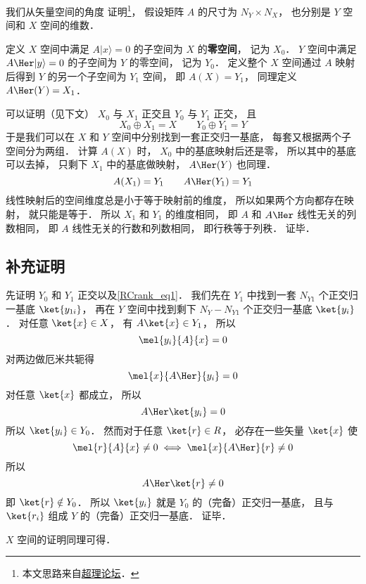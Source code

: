

我们从矢量空间的角度 证明\footnote{本文思路来自\href{https://chaoli.club/index.php/4821}{超理论坛}．}， 假设矩阵 $A$ 的尺寸为 $N_Y \times N_X$， 也分别是 $Y$ 空间和 $X$ 空间的维数．

定义 $X$ 空间中满足 $A |x\rangle = 0$ 的子空间为 $X$ 的\textbf{零空间}， 记为 $X_0$． $Y$ 空间中满足 $A\Her |y\rangle = 0$ 的子空间为 $Y$ 的零空间， 记为 $Y_0$． 定义整个 $X$ 空间通过 $A$ 映射后得到 $Y$ 的另一个子空间为 $Y_1$ 空间， 即 $A(X) = Y_1$， 同理定义 $A\Her(Y) = X_1$． %

可以证明（见下文） $X_0$ 与 $X_1$ 正交且 $Y_0$ 与 $Y_1$ 正交， 且
\begin{equation}\label{RCrank_eq1}
X_0 \oplus X_1 = X
\qquad
Y_0 \oplus Y_1 = Y
\end{equation}
于是我们可以在 $X$ 和 $Y$ 空间中分别找到一套正交归一基底， 每套又根据两个子空间分为两组． 计算 $A(X)$ 时， $X_0$ 中的基底映射后还是零， 所以其中的基底可以去掉， 只剩下 $X_1$ 中的基底做映射， $A\Her(Y)$ 也同理．
\begin{equation}
A(X_1) = Y_1
\qquad
A\Her(Y_1) = Y_1
\end{equation}
线性映射后的空间维度总是小于等于映射前的维度， 所以如果两个方向都存在映射， 就只能是等于． 所以 $X_1$ 和 $Y_1$ 的维度相同， 即 $A$ 和 $A\Her$ 线性无关的列数相同， 即 $A$ 线性无关的行数和列数相同， 即行秩等于列秩． 证毕．

\subsection{补充证明}
先证明 $Y_0$ 和 $Y_1$ 正交以及\autoref{RCrank_eq1}． 我们先在 $Y_1$ 中找到一套 $N_{Y1}$ 个正交归一基底 $\ket{y_{1i}}$， 再在 $Y$ 空间中找到剩下 $N_Y - N_{Y1}$ 个正交归一基底 $\ket{y_i}$． 对任意 $\ket{x} \in X$， 有 $A \ket{x} \in Y_1$， 所以
\begin{equation}
\mel{y_i}{A}{x} = 0
\end{equation}
对两边做厄米共轭得%
\begin{equation}
\mel{x}{A\Her}{y_i} = 0
\end{equation}
对任意 $\ket{x}$ 都成立， 所以
\begin{equation}
A\Her\ket{y_i} = 0
\end{equation}
所以 $\ket{y_i} \in Y_0$． 然而对于任意 $\ket{r} \in R$， 必存在一些矢量 $\ket{x}$ 使
\begin{equation}
\mel{r}{A}{x} \ne 0
\iff
\mel{x}{A\Her}{r} \ne 0
\end{equation}
所以
\begin{equation}
A\Her\ket{r} \ne 0
\end{equation}
即 $\ket{r} \notin Y_0$． 所以 $\ket{y_i}$ 就是 $Y_0$ 的（完备）正交归一基底， 且与 $\ket{r_i}$ 组成 $Y$ 的（完备）正交归一基底． 证毕．

$X$ 空间的证明同理可得．
